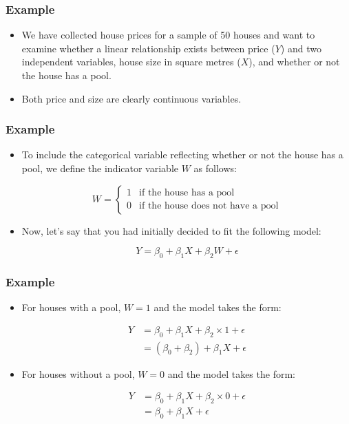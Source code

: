 \documentclass[14pt]{beamer}
\begin{document}
\begin{frame}
	\frametitle{Example}
	
	\begin{itemize}[label={\color{blue}$\blacktriangleright$}]
		\item We have collected house prices for a sample of 50 houses and want to examine whether a linear relationship exists between price ($Y$) and two independent variables, house size in square metres ($X$), and whether or not the house has a pool.
		
		\item Both price and size are clearly continuous variables.
	\end{itemize}
	
\end{frame}
\begin{frame}
	\frametitle{Example}
	
	\begin{itemize}[label={\color{blue}$\blacktriangleright$}]
		\item To include the categorical variable reflecting whether or not the house has a pool, we define the indicator variable $W$ as follows:
		
		\[
		W = \begin{cases}
			1 & \text{if the house has a pool} \\
			0 & \text{if the house does not have a pool}
		\end{cases}
		\]
		
		\item Now, let's say that you had initially decided to fit the following model:
		
		\[
		Y = \beta_0 + \beta_1X + \beta_2W + \epsilon
		\]
	\end{itemize}
	
\end{frame}
\begin{frame}
	\frametitle{Example}
	
	\begin{itemize}[label={\color{blue}$\blacktriangleright$}]
		\item For houses with a pool, $W = 1$ and the model takes the form:
		
		\begin{align*}
			Y &= \beta_0 + \beta_1X + \beta_2 \times 1 + \epsilon \\
			&= (\beta_0 + \beta_2) + \beta_1X + \epsilon
		\end{align*}
		
		\item For houses without a pool, $W = 0$ and the model takes the form:
		
		\begin{align*}
			Y &= \beta_0 + \beta_1X + \beta_2 \times 0 + \epsilon \\
			&= \beta_0 + \beta_1X + \epsilon
		\end{align*}
	\end{itemize}
	
\end{frame}
\end{document}
